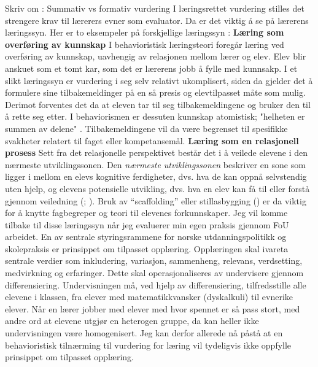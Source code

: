 \documentclass[main.tex]{subfiles}
\begin{document}
Skriv om : Summativ vs formativ vurdering
\newline
\newline
I læringsrettet vurdering stilles det strengere krav til lærerers evner som evaluator. Da er det viktig å se på lærerens læringssyn. 
Her er to eksempeler på forskjellige læringssyn :
\newline
\newline
\textbf{Læring som overføring av kunnskap}
\newline
I behavioristisk læringsteori foregår læring ved overføring av kunnskap, uavhengig av relasjonen mellom lærer 
og elev. Elev blir anskuet som et tomt kar, som det er lærerens jobb å fylle med kunnsakp. 
I et slikt læringssyn er vurdering i seg selv relativt ukomplisert, siden da gjelder det å 
formulere sine tilbakemeldinger på en så presis og elevtilpasset måte som mulig.
Derimot forventes det da at eleven tar til seg tilbakemeldingene og bruker den til å rette seg etter.
I behaviorismen er dessuten kunnskap atomistisk; "helheten er summen av delene" .
Tilbakemeldingene vil da være begrenset til spesifikke svakheter relatert til faget eller kompetansemål. 
\newline
\newline
\textbf{Læring som en relasjonell prosess}
\newline
Sett fra det relasjonelle perspektivet består det i å veilede elevene i den nærmeste utviklingssonen.
Den \emph{nærmeste utviklingssonen} beskriver en sone som ligger i mellom en elevs kognitive 
ferdigheter, dvs. hva de kan oppnå selvstendig uten hjelp, og elevens potensielle utvikling, dvs. 
hva en elev kan få til eller forstå gjennom veiledning (; ). 
Bruk av ``scaffolding'' eller stillasbygging () er da viktig for å knytte fagbegreper og teori til elevenes 
forkunnskaper. Jeg vil komme tilbake til disse læringssyn når jeg evaluerer min egen praksis gjennom FoU arbeidet.
\newline
\newline
En av sentrale styringsrammene for norske utdanningspolitikk og skolepraksis er prinsippet om tilpasset opplæring.
Opplæringen skal ivareta sentrale verdier som inkludering, variasjon, sammenheng, relevans, verdsetting, medvirkning og erfaringer.
Dette skal operasjonaliseres av undervisere gjennom differensiering.  Undervisningen må, ved hjelp av differensiering, 
tilfredsstille alle elevene i klassen, fra elever med matematikkvansker (dyskalkuli) til evnerike elever. Når en lærer jobber 
med elever med hvor spennet er så pass stort, med andre ord at elevene utgjør en heterogen gruppe, da kan heller ikke undervisningen 
være homogenisert. Jeg kan derfor allerede nå påstå at en behavioristisk tilnærming til vurdering for læring vil tydeligvis ikke 
oppfylle prinsippet om tilpasset opplæring.
\end{document}

